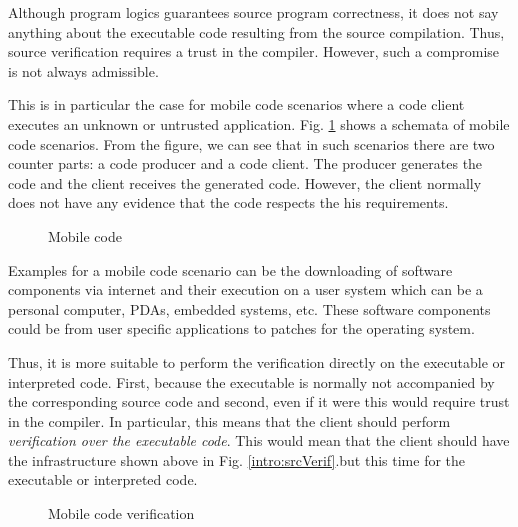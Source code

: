 Although  program logics  guarantees source program correctness, it does not say anything about the executable code
resulting from the source compilation. Thus, source verification requires a  trust in the compiler.
However,  such a compromise is not always admissible. 



This is in particular  the case for mobile code scenarios  where a code client
executes an unknown or untrusted application. 
Fig. \ref{intro:mobile} shows a schemata of mobile code scenarios. From the figure, we can see that in such scenarios 
there are two counter parts:  a code producer and a code client. The producer generates the code and the client 
receives the generated code. However, the client  normally does not have any evidence that the code respects the 
his requirements.
\begin{figure}[ht!]
\begin{center}
\caption{\sc Mobile code}
\label{intro:mobile}
\end{center}
\end{figure} 

Examples for a mobile code scenario can be the downloading of software components  via internet  and their execution  on a user system which can be a personal computer,
 PDAs, embedded systems, etc. These software components could be from user specific applications to patches for the operating system.

 


Thus, it is more suitable to perform the verification  directly on the executable or interpreted code.
First, because the executable is normally not accompanied by the corresponding source code and second, even if it were this would require 
trust in the compiler. In particular, this means that the client should perform \textit{ verification over the executable code}. This would mean that  the client should 
have the infrastructure shown above in Fig. \ref{intro:srcVerif}.but this time for the executable or interpreted code.

\begin{figure}[ht!]
\begin{center}
\caption{\sc Mobile code verification}
\label{intro:mobileVerif}
\end{center}
\end{figure}

